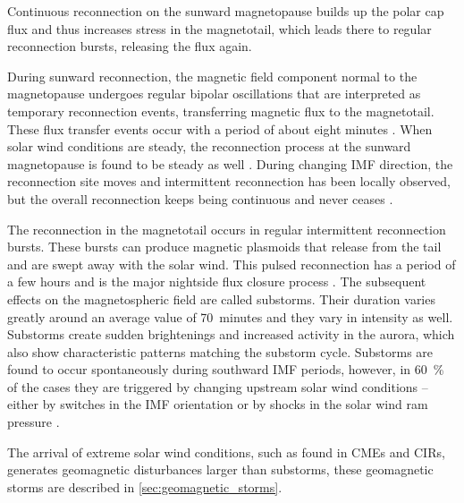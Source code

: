 Continuous reconnection on the sunward magnetopause builds up the polar cap flux and thus increases stress in the magnetotail, which leads there to regular reconnection bursts, releasing the flux again.

During sunward reconnection, the magnetic field component normal to the magnetopause undergoes regular bipolar oscillations that are interpreted as temporary reconnection events, transferring magnetic flux to the magnetotail. These flux transfer events occur with a period of about eight minutes \citep{Russell1996}. When solar wind conditions are steady, the reconnection process at the sunward magnetopause is found to be steady as well \citep{Phan2005}. During changing IMF direction, the reconnection site moves and intermittent reconnection has been locally observed, but the overall reconnection keeps being continuous and never ceases \citep{Phan2005}.

The reconnection in the magnetotail occurs in regular intermittent reconnection bursts. These bursts can produce magnetic plasmoids that release from the tail and are swept away with the solar wind. This pulsed reconnection has a period of a few hours and is the major nightside flux closure process \citep{Milan2007}. The subsequent effects on the magnetospheric field are called substorms. Their duration varies greatly around an average value of 70~minutes and they vary in intensity as well. Substorms create sudden brightenings and increased activity in the aurora, which also show characteristic patterns matching the substorm cycle. Substorms are found to occur spontaneously during southward IMF periods, however, in \SI{60}{\percent} of the cases they are triggered by changing upstream solar wind conditions -- either by switches in the IMF orientation or by shocks in the solar wind ram pressure \citep{Milan2007}.

The arrival of extreme solar wind conditions, such as found in CMEs and CIRs, generates geomagnetic disturbances larger than substorms, these geomagnetic storms are described in \autoref{sec:geomagnetic_storms}.


